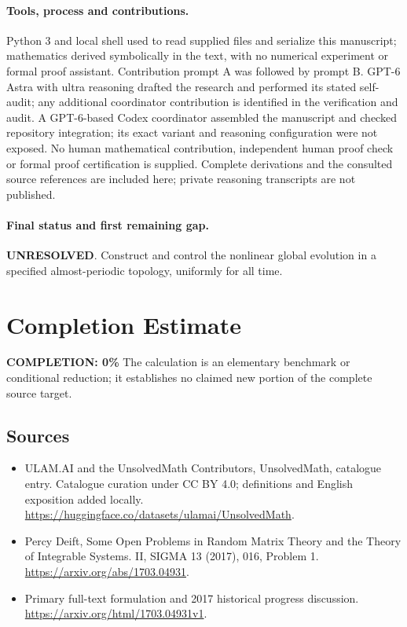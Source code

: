 \documentclass[11pt]{article}
\begin{document}
\paragraph{Tools, process and contributions.}
Python 3 and local shell used to read supplied files and serialize this manuscript; mathematics derived symbolically in the text, with no numerical experiment or formal proof assistant. Contribution prompt A was followed by prompt B. GPT-6 Astra with ultra reasoning drafted the research and performed its stated self-audit; any additional coordinator contribution is identified in the verification and audit. A GPT-6-based Codex coordinator assembled the manuscript and checked repository integration; its exact variant and reasoning configuration were not exposed. No human mathematical contribution, independent human proof check or formal proof certification is supplied. Complete derivations and the consulted source references are included here; private reasoning transcripts are not published.

\paragraph{Final status and first remaining gap.}
\textbf{UNRESOLVED}. Construct and control the nonlinear global evolution in a specified almost-periodic topology, uniformly for all time.

\section{Completion Estimate}
\noindent\textbf{COMPLETION: 0\%}
The calculation is an elementary benchmark or conditional reduction; it establishes no claimed new portion of the complete source target.

\subsection{Sources}
\begin{itemize}
\item[\hypertarget{source:statement:1}{S1}] ULAM.AI and the UnsolvedMath Contributors, UnsolvedMath, catalogue entry. Catalogue curation under CC BY 4.0; definitions and English exposition added locally.
\url{https://huggingface.co/datasets/ulamai/UnsolvedMath}.
\item[\hypertarget{source:statement:2}{S2}] Percy Deift, Some Open Problems in Random Matrix Theory and the Theory of Integrable Systems. II, SIGMA 13 (2017), 016, Problem 1.
\url{https://arxiv.org/abs/1703.04931}.
\item[\hypertarget{source:statement:3}{S3}] Primary full-text formulation and 2017 historical progress discussion.
\url{https://arxiv.org/html/1703.04931v1}.
\end{itemize}
\label{end:statement}
\end{document}
